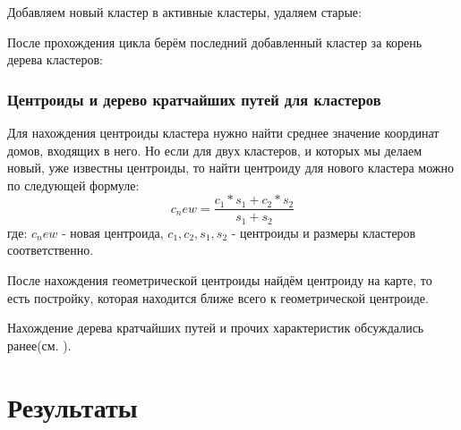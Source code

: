 \documentclass[11pt]{article}
\begin{document}
	Добавляем новый кластер в активные кластеры, удаляем старые:
	

	После прохождения цикла берём последний добавленный кластер за корень дерева кластеров:
	

	\subsubsection{Центроиды и дерево кратчайших путей для кластеров}

	Для нахождения центроиды кластера нужно найти среднее значение координат домов, входящих в него. Но если для двух кластеров, и которых мы делаем новый, уже известны центроиды, то найти центроиду для нового кластера можно по следующей формуле:
	\[
		c_new = \frac{c_1 * s_1 + c_2 * s_2}{s_1 + s_2}
	\] 
	где: $c_new$ - новая центроида, $c_1, c_2, s_1, s_2$ - центроиды и размеры кластеров соответственно.

	После нахождения геометрической центроиды найдём центроиду на карте, то есть постройку, которая находится ближе всего к геометрической центроиде.

	

	Нахождение дерева кратчайших путей и прочих характеристик обсуждались ранее(см. ).

    \section{Результаты}\label{section:results}
	
	\pagebreak

	
	
	
\end{document}
